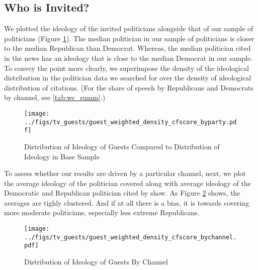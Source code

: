\documentclass[12pt, letterpaper]{article}
\begin{document}
\subsection*{Who is Invited?}
We plotted the ideology of the invited politicians alongside that of our sample of politicians (Figure \ref{fig:guest_weighted_density_cfscore_byparty}). The median politician in our sample of politicians is closer to the median Republican than Democrat. Whereas, the median politician cited in the news has an ideology that is close to the median Democrat in our sample. To convey the point more clearly, we superimpose the density of the ideological distribution in the politician data we searched for over the density of ideological distribution of citations. (For the share of speech by Republicans and Democrats by channel, see \ref{tab:wc_summ}.)

\begin{figure}[h]
  \centering
  \caption{Distribution of Ideology of Guests Compared to Distribution of Ideology in Base Sample}
  \texttt{[image: ../figs/tv\_guests/guest\_weighted\_density\_cfscore\_byparty.pdf]}
  \label{fig:guest_weighted_density_cfscore_byparty}
\end{figure}

To assess whether our results are driven by a particular channel, next, we plot the average ideology of the politician covered along with average ideology of the Democratic and Republican politician cited by show. As Figure \ref{fig:guest_weighted_density_cfscore_bychannel} shows, the averages are tighly clustered. And if at all there is a bias, it is towards covering more moderate politicians, especially less extreme Republicans.

\begin{figure}[h]
  \centering
  \caption{Distribution of Ideology of Guests By Channel}
  \texttt{[image: ../figs/tv\_guests/guest\_weighted\_density\_cfscore\_bychannel.pdf]}
  \label{fig:guest_weighted_density_cfscore_bychannel}
\end{figure}
\end{document}

